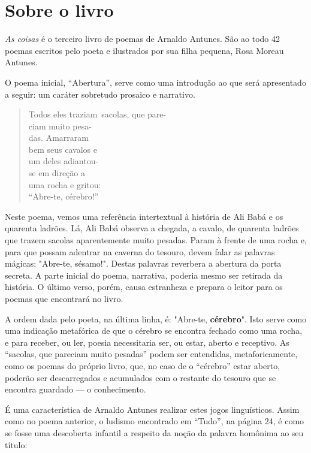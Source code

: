 \documentclass[11pt]{extarticle}
\begin{document}
\section{Sobre o livro}

\textit{As coisas} é o terceiro livro de poemas de Arnaldo Antunes. 
São ao todo 42 poemas escritos pelo poeta e ilustrados por sua filha
pequena, Rosa Moreau Antunes. 

O poema inicial, ``Abertura'', serve como uma introdução ao que será
apresentado a seguir: um caráter sobretudo prosaico e narrativo.

\begin{verse}
Todos eles traziam\
sacolas, que pare-\\
ciam muito pesa-\\
das. Amarraram\\
bem seus cavalos e\\
um deles adiantou-\\
se em direção a\\
uma rocha e gritou:\\
``Abre-te, cérebro!''\\
\end{verse}

Neste poema, vemos uma referência intertextual à história de Ali Babá 
e os quarenta ladrões. Lá, Ali Babá observa a chegada, a cavalo, de
quarenta ladrões que trazem sacolas aparentemente muito pesadas. 
Param à frente de uma rocha e, para que possam adentrar na caverna do tesouro, 
devem falar as palavras mágicas: "Abre-te, sésamo!". Destas palavras
reverbera a abertura da porta secreta. A parte inicial do poema, narrativa, 
poderia mesmo ser retirada da história. O último verso, porém, causa 
estranheza e prepara o leitor para os poemas que encontrará no livro.

A ordem dada pelo poeta, na última linha, é: "Abre-te, \textbf{cérebro}". Isto serve como
uma indicação metafórica de que o cérebro se encontra fechado como uma rocha, e para
receber, ou ler, poesia necessitaria ser, ou estar, aberto e receptivo.
As ``sacolas, que pareciam muito pesadas'' podem ser entendidas, metaforicamente, como os 
poemas do próprio livro, que, no caso de o ``cérebro'' estar aberto, poderão ser descarregados e
acumulados com o restante do tesouro que se encontra guardado --- o conhecimento. 

É uma característica de Arnaldo Antunes realizar estes jogos linguísticos. 
Assim como no
poema anterior, o ludismo encontrado em ``Tudo'', na página 24, é como se fosse uma
descoberta infantil a respeito da noção da palavra homônima ao seu título:
\end{document}
